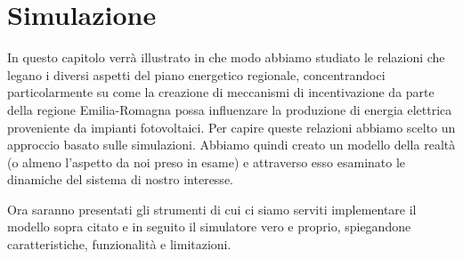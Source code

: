 






%
\clearpage{\pagestyle{empty}\cleardoublepage}
\chapter{Simulazione}

In questo capitolo verrà illustrato in che modo abbiamo studiato le relazioni che legano i diversi aspetti del piano energetico regionale, concentrandoci particolarmente su come la creazione di meccanismi di incentivazione da parte della regione Emilia-Romagna possa influenzare la produzione di energia elettrica proveniente da impianti fotovoltaici.
Per capire queste relazioni abbiamo scelto un approccio basato sulle simulazioni. Abbiamo quindi creato un modello della realtà (o almeno l'aspetto da noi preso in esame) e attraverso esso esaminato le dinamiche del sistema di nostro interesse.

Ora saranno presentati gli strumenti di cui ci siamo serviti implementare il modello sopra citato e in seguito il simulatore vero e proprio, spiegandone caratteristiche, funzionalità e limitazioni.

